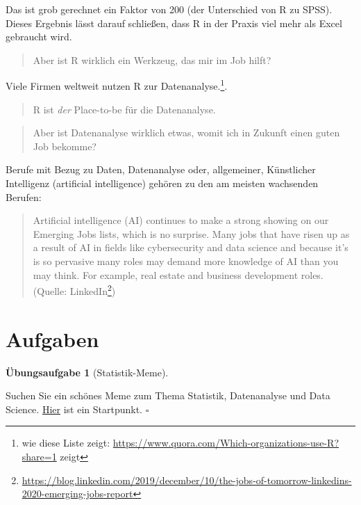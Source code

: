 \documentclass[
  a4paper,
  DIV=11]{scrreprt}
\theoremstyle{definition}
\newtheorem{exercise}{Übungsaufgabe}[chapter]
\theoremstyle{definition}
\theoremstyle{definition}
\theoremstyle{remark}
\begin{document}
Das ist grob gerechnet ein Faktor von 200 (der Unterschied von R zu
SPSS). Dieses Ergebnis lässt darauf schließen, dass R in der Praxis viel
mehr als Excel gebraucht wird.

\begin{quote}
{} Aber ist R wirklich ein Werkzeug, das mir im Job
hilft?
\end{quote}

Viele Firmen weltweit nutzen R zur Datenanalyse.\footnote{wie diese
  Liste zeigt:
  \url{https://www.quora.com/Which-organizations-use-R?share=1} zeigt}.

\begin{quote}
{} R ist \emph{der} Place-to-be für die
Datenanalyse.
\end{quote}

\begin{quote}
{} Aber ist Datenanalyse wirklich etwas, womit ich in
Zukunft einen guten Job bekomme?
\end{quote}

Berufe mit Bezug zu Daten, Datenanalyse oder, allgemeiner, Künstlicher
Intelligenz (artificial intelligence) gehören zu den am meisten
wachsenden Berufen:

\begin{quote}
Artificial intelligence (AI) continues to make a strong showing on our
Emerging Jobs lists, which is no surprise. Many jobs that have risen up
as a result of AI in ﬁelds like cybersecurity and data science and
because it's is so pervasive many roles may demand more knowledge of AI
than you may think. For example, real estate and business development
roles. (Quelle: LinkedIn\footnote{\url{https://blog.linkedin.com/2019/december/10/the-jobs-of-tomorrow-linkedins-2020-emerging-jobs-report}})
\end{quote}

\section{Aufgaben}\label{aufgaben-1}

\begin{exercise}[Statistik-Meme]\protect\hypertarget{exr-meme}{}\label{exr-meme}

Suchen Sie ein schönes Meme zum Thema Statistik, Datenanalyse und Data
Science.
\href{https://data-se.netlify.app/2021/02/23/data-science-memes/}{Hier}
ist ein Startpunkt. \(\square\)

\end{exercise}
\end{document}

